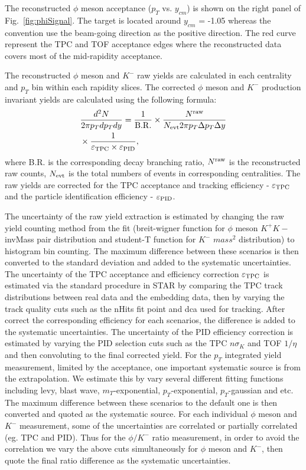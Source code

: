 \documentclass[%
 reprint,	
showpacs,
 amsmath,amssymb,
 aps,
 prc,
]{revtex4-1}
\begin{document}
The reconstructed $\phi$ meson acceptance ($p_T$ vs. $y_{cm}$) is shown on the right panel of Fig.~\ref{fig:phiSignal}. The target is located around $y_{cm}$ = -1.05 whereas the convention use the beam-going direction as the positive direction. The red curve represent the TPC and TOF acceptance edges where the reconstructed data covers most of the mid-rapidity acceptance. 


The reconstructed $\phi$ meson and $K^-$ raw yields are calculated in each centrality and $p_{T}$ bin within each rapidity slices. The corrected $\phi$ meson and $K^-$ production invariant yields are calculated using the following formula:
\begin{equation}
  \begin{aligned}
& \frac{d^2N}{2\pi p_{T}dp_{T}dy} = \frac{1}{\rm B.R.} \times \frac{N^{\rm raw}}{N_{\rm evt} 2\pi p_{T}\Delta p_{T}\Delta y} \\
& \times \frac{1}{\varepsilon_{\rm TPC}\times\varepsilon_{\rm PID}},
  \end{aligned}
\label{equ:invariantyield}
\end{equation}
where B.R. is the corresponding decay branching ratio, $N^{\rm raw}$ is the reconstructed raw counts, $N_{\rm evt}$ is the total numbers of events in corresponding centralities. The raw yields are corrected for the TPC acceptance and tracking efficiency - $\varepsilon_{\rm TPC}$ and the particle identification efficiency - $\varepsilon_{\rm PID}$.


The uncertainty of the raw yield extraction is estimated by changing the raw yield counting method from the fit (breit-wigner function for $\phi$ meson $K^+K-$ invMass pair distribution and student-T function for $K^-$ $mass^2$ distribution) to histogram bin counting. The maximum difference between these scenarios is then converted to the standard deviation and added to the systematic uncertainties. The uncertainty of the TPC acceptance and efficiency correction $\varepsilon_{\rm TPC}$ is estimated via the standard procedure in STAR by comparing the TPC track distributions between real data and the embedding data, then by varying the track quality cuts such as the nHits fit point and dca used for tracking. After correct the corresponding efficiency for each scenarios, the difference is added to the systematic uncertainties. The uncertainty of the PID efficiency correction is estimated by varying the PID selection cuts such as the TPC $n\sigma_{K}$ and TOF $1/\eta$ and then convoluting to the final corrected yield. For the $p_T$ integrated yield measurement, limited by the acceptance, one important systematic source is from the extrapolation. We estimate this by vary several different fitting functions including levy, blast wave, $m_T$-exponential, $p_T$-exponential, $p_T$-gaussian and etc. The maximum difference between these scenarios to the default one is then converted and quoted as the systematic source. For each individual $\phi$ meson and $K^-$ measurement, some of the uncertainties are correlated or partially correlated (eg. TPC and PID). Thus for the $\phi/K^-$ ratio measurement, in order to avoid the correlation we vary the above cuts simultaneously for $\phi$ meson and $K^-$, then quote the final ratio difference as the systematic uncertainties.
\end{document}
